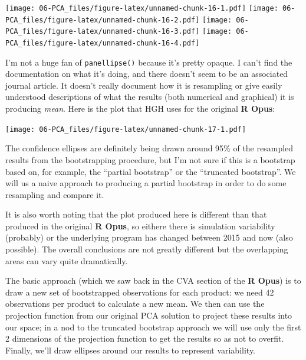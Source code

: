 \documentclass[
]{book}
\newenvironment{Shaded}{\begin{snugshade}}{\end{snugshade}}
\newcommand{\NormalTok}[1]{#1}
\newcommand{\SpecialCharTok}[1]{\textcolor[rgb]{0.81,0.36,0.00}{\textbf{#1}}}
\begin{document}
\texttt{[image: 06-PCA\_files/figure-latex/unnamed-chunk-16-1.pdf]} \texttt{[image: 06-PCA\_files/figure-latex/unnamed-chunk-16-2.pdf]} \texttt{[image: 06-PCA\_files/figure-latex/unnamed-chunk-16-3.pdf]} \texttt{[image: 06-PCA\_files/figure-latex/unnamed-chunk-16-4.pdf]}

I'm not a huge fan of \texttt{panellipse()} because it's pretty opaque. I can't find the documentation on what it's doing, and there doesn't seem to be an associated journal article. It doesn't really document how it is resampling or give easily understood descriptions of what the results (both numerical and graphical) it is producing \emph{mean}. Here is the plot that HGH uses for the original \textbf{R Opus}:

\begin{Shaded}
\end{Shaded}

\texttt{[image: 06-PCA\_files/figure-latex/unnamed-chunk-17-1.pdf]}

The confidence ellipses are definitely being drawn around 95\% of the resampled results from the bootstrapping procedure, but I'm not sure if this is a bootstrap based on, for example, the ``partial bootstrap'' or the ``truncated bootstrap''. We will us a naive approach to producing a partial bootstrap in order to do some resampling and compare it.

It is also worth noting that the plot produced here is different than that produced in the original \textbf{R Opus}, so eithere there is simulation variability (probably) or the underlying program has changed between 2015 and now (also possible). The overall conclusions are not greatly different but the overlapping areas can vary quite dramatically.

The basic approach (which we saw back in the CVA section of the \textbf{R Opus}) is to draw a new set of bootstrapped observations for each product: we need 42 observations per product to calculate a new mean. We then can use the projection function from our original PCA solution to project these results into our space; in a nod to the truncated bootstrap approach \citep{cadoretConstruction2013} we will use only the first 2 dimensions of the projection function to get the results so as not to overfit. Finally, we'll draw ellipses around our results to represent variability.
\end{document}
